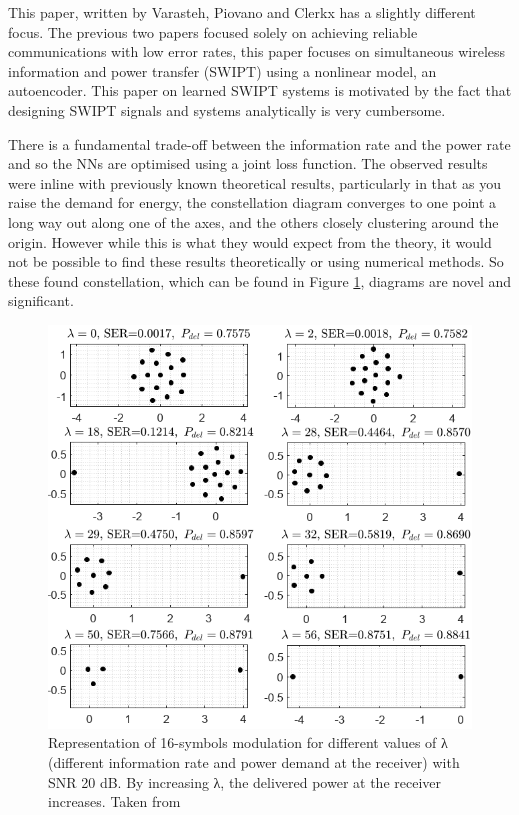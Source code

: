 \documentclass[12pt,onecolumn,letterpaper]{article}
\begin{document}
This paper, written by Varasteh, Piovano and Clerkx has a slightly different focus. The previous two papers focused solely on achieving reliable communications with low error rates, this paper focuses on simultaneous wireless information and power transfer (SWIPT) using a nonlinear model, an autoencoder. This paper on learned SWIPT systems is motivated by the fact that designing SWIPT signals and systems analytically is very cumbersome. 

There is a fundamental trade-off between the information rate and the power rate and so the NNs are optimised using a joint loss function. The observed results were inline with previously known theoretical results, particularly in that as you raise the demand for energy, the constellation diagram converges to one point a long way out along one of the axes, and the others closely clustering around the origin. However while this is what they would expect from the theory, it would not be possible to find these results theoretically or using numerical methods. So these found constellation, which can be found in Figure \ref{fig:VarastehConstellationDiagrams}, diagrams are novel and significant.

\begin{figure}[t]
\begin{center}
   \includegraphics[width=0.8\linewidth]{figures/Varasteh_novel_constellation_diagrams.PNG}
\end{center}
   \caption{Representation of 16-symbols modulation for different values of λ (different information rate and power demand at the receiver) with SNR 20 dB. By increasing λ, the delivered power at the receiver increases. Taken from~\cite{Clerkx}}
\label{fig:VarastehConstellationDiagrams}
\end{figure}
\end{document}
